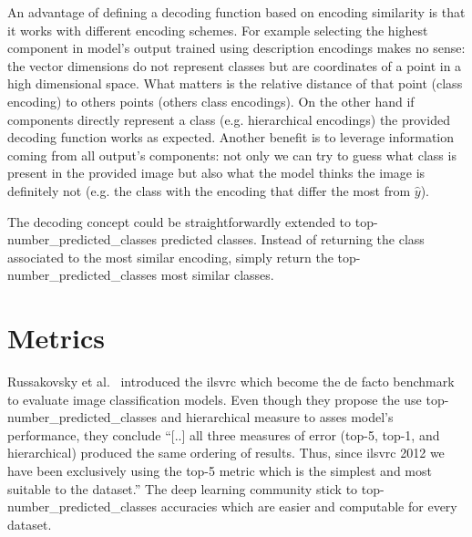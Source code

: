 An advantage of defining a decoding function based on encoding similarity is that it works with different encoding schemes. For example selecting the highest component in model's output trained using description encodings makes no sense: the vector dimensions do not represent classes but are coordinates of a point in a high dimensional space. What matters is the relative distance of that point (class encoding) to others points (others class encodings).
On the other hand if components directly represent a class (e.g. hierarchical encodings) the provided decoding function works as expected.
Another benefit is to leverage information coming from all output's components: not only we can try to guess what class is present in the provided image but also what the model thinks the image is definitely not (e.g. the class with the encoding that differ the most from $\hat{y}$).\medskip

The decoding concept could be straightforwardly extended to top-\gls{number_predicted_classes} predicted classes. Instead of returning the class associated to the most similar encoding, simply return the top-\gls{number_predicted_classes} most similar classes.



\section{Metrics}
\label{sec:metrics}
Russakovsky et al.~\cite{ImagenetLargeRussak2014} introduced the \acrfull{ilsvrc} which become the de facto benchmark to evaluate image classification models.
Even though they propose the use top-\gls{number_predicted_classes} and hierarchical measure to asses model's performance, they conclude ``[..] all three measures of error (top-5, top-1, and hierarchical) produced the same ordering of results. Thus, since \acrshort{ilsvrc} 2012 we have been exclusively using the top-5 metric which is the simplest and most suitable to the dataset.''
The deep learning community stick to top-\gls{number_predicted_classes} accuracies which are easier and computable for every dataset.

